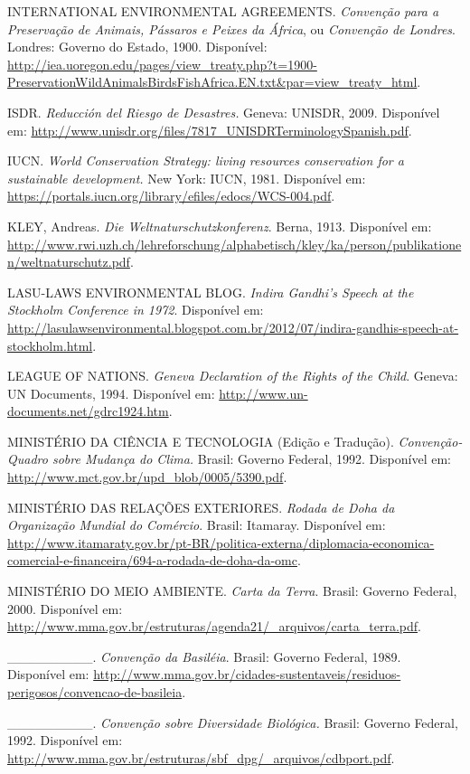 INTERNATIONAL ENVIRONMENTAL AGREEMENTS. \emph{Convenção para a
Preservação de Animais, Pássaros e Peixes da África}, ou \emph{Convenção
de Londres}. Londres: Governo do Estado, 1900. Disponível:
\url{http://iea.uoregon.edu/pages/view_treaty.php?t=1900-PreservationWildAnimalsBirdsFishAfrica.EN.txt\&par=view_treaty_html}.

ISDR. \emph{Reducción del Riesgo de Desastres.} Geneva: UNISDR, 2009.
Disponível em:
\url{http://www.unisdr.org/files/7817_UNISDRTerminologySpanish.pdf}.

IUCN. \emph{World Conservation Strategy: living resources conservation
for a sustainable development.} New York: IUCN, 1981. Disponível em:
\url{https://portals.iucn.org/library/efiles/edocs/WCS-004.pdf}.

KLEY, Andreas. \emph{Die Weltnaturschutzkonferenz}. Berna, 1913.
Disponível em:
\url{http://www.rwi.uzh.ch/lehreforschung/alphabetisch/kley/ka/person/publikationen/weltnaturschutz.pdf}.

LASU-LAWS ENVIRONMENTAL BLOG. \emph{Indira Gandhi's Speech at the
Stockholm Conference in 1972}. Disponível em:
\url{http://lasulawsenvironmental.blogspot.com.br/2012/07/indira-gandhis-speech-at-stockholm.html}.

LEAGUE OF NATIONS. \emph{Geneva Declaration of the Rights of the Child}.
Geneva: UN Documents, 1994. Disponível em:
\url{http://www.un-documents.net/gdrc1924.htm}.

MINISTÉRIO DA CIÊNCIA E TECNOLOGIA (Edição e Tradução). \emph{Convenção-
Quadro sobre Mudança do Clima.} Brasil: Governo Federal, 1992.
Disponível em: \url{http://www.mct.gov.br/upd_blob/0005/5390.pdf}.

MINISTÉRIO DAS RELAÇÕES EXTERIORES. \emph{Rodada de Doha da Organização
Mundial do Comércio}. Brasil: Itamaray. Disponível em:
\url{http://www.itamaraty.gov.br/pt-BR/politica-externa/diplomacia-economica-comercial-e-financeira/694-a-rodada-de-doha-da-omc}.

MINISTÉRIO DO MEIO AMBIENTE. \emph{Carta da Terra}. Brasil: Governo
Federal, 2000. Disponível em:
\href{http://www.mma.gov.br/estruturas/agenda21/_arquivos/carta_terra.pdf}{{http://www.mma.gov.br/estruturas/agenda21/\_arquivos/carta\_terra.pdf}}.

\_\_\_\_\_\_\_\_\_. \emph{Convenção da Basiléia}. Brasil: Governo
Federal, 1989. Disponível em:
\url{http://www.mma.gov.br/cidades-sustentaveis/residuos-perigosos/convencao-de-basileia}.

\_\_\_\_\_\_\_\_\_. \emph{Convenção sobre Diversidade Biológica.}
Brasil: Governo Federal, 1992. Disponível em:
\url{http://www.mma.gov.br/estruturas/sbf_dpg/_arquivos/cdbport.pdf}.

